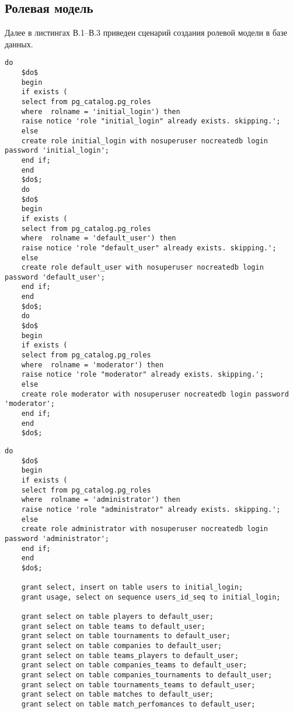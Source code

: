 \begin{appendices}
\chapter{Ролевая модель}

Далее в листингах В.1--В.3 приведен сценарий создания ролевой модели в базе данных.

\begin{lstlisting}[caption={Сценарий создания ролевой модели в базе данных (часть 1)}]
	do
	$do$
	begin
	if exists (
	select from pg_catalog.pg_roles
	where  rolname = 'initial_login') then
	raise notice 'role "initial_login" already exists. skipping.';
	else
	create role initial_login with nosuperuser nocreatedb login password 'initial_login';
	end if;
	end
	$do$;
	do
	$do$
	begin
	if exists (
	select from pg_catalog.pg_roles
	where  rolname = 'default_user') then
	raise notice 'role "default_user" already exists. skipping.';
	else
	create role default_user with nosuperuser nocreatedb login password 'default_user';
	end if;
	end
	$do$;
	do
	$do$
	begin
	if exists (
	select from pg_catalog.pg_roles
	where  rolname = 'moderator') then
	raise notice 'role "moderator" already exists. skipping.';
	else
	create role moderator with nosuperuser nocreatedb login password 'moderator';
	end if;
	end
	$do$;
\end{lstlisting}

\clearpage

\begin{lstlisting}[caption={Сценарий создания ролевой модели в базе данных (часть 2)}]
	do
	$do$
	begin
	if exists (
	select from pg_catalog.pg_roles
	where  rolname = 'administrator') then
	raise notice 'role "administrator" already exists. skipping.';
	else
	create role administrator with nosuperuser nocreatedb login password 'administrator';
	end if;
	end
	$do$;
	
	grant select, insert on table users to initial_login;
	grant usage, select on sequence users_id_seq to initial_login;
	
	grant select on table players to default_user;
	grant select on table teams to default_user;
	grant select on table tournaments to default_user;
	grant select on table companies to default_user;
	grant select on table teams_players to default_user;
	grant select on table companies_teams to default_user;
	grant select on table companies_tournaments to default_user;
	grant select on table tournaments_teams to default_user;
	grant select on table matches to default_user;
	grant select on table match_perfomances to default_user;
	

\end{lstlisting}
\end{appendices}

